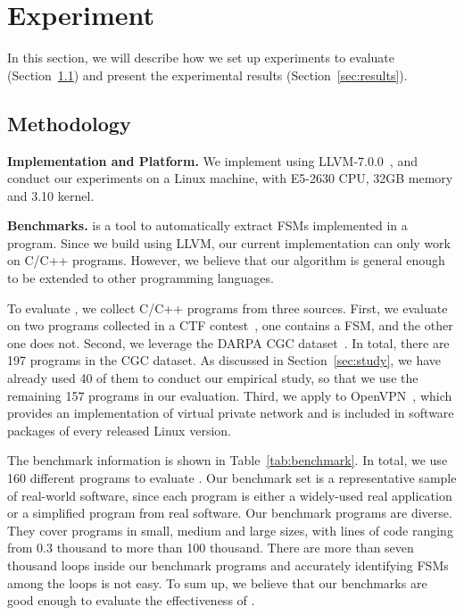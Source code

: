 \section{Experiment}
\label{sec:exp}

In this section, we will describe how we set up
experiments to evaluate \Tool{} (Section~\ref{sec:meth})
and present the experimental results (Section~\ref{sec:results}).

\subsection{Methodology}
\label{sec:meth}

\noindent\textbf{Implementation and Platform.}
We implement \Tool{} using LLVM-7.0.0~\cite{LLVM},
and conduct our experiments on a Linux machine,
with E5-2630 CPU, 32GB memory and 3.10 kernel.

\noindent\textbf{Benchmarks.}
\Tool{} is a tool to automatically extract FSMs implemented in a program.
Since we build \Tool{} using LLVM,
our current implementation can only work on C/C++ programs.
However, we believe that our algorithm is general enough
to be extended to other programming languages.


To evaluate \Tool{}, we collect C/C++ programs from three sources.
First, we evaluate \Tool{} on two programs collected in a CTF contest~\cite{ctf},
one contains a FSM, and the other one does not.
Second, we leverage the DARPA CGC dataset~\cite{CGC}.
In total, there are 197 programs in the CGC dataset.
As discussed in Section~\ref{sec:study},
we have already used 40 of them to conduct our empirical study,
so that we use the remaining 157 programs in our evaluation.
Third, we apply \Tool{} to OpenVPN~\cite{openvpn},
which provides an implementation of virtual private network and
is included in software packages of every released Linux version.



The benchmark information is shown in Table~\ref{tab:benchmark}.
In total, we use 160 different programs to evaluate \Tool{}.
Our benchmark set is a representative sample of real-world software,
since each program is either a widely-used real application or a simplified program
from real software.
Our benchmark programs are diverse.
They cover programs in small, medium and large sizes,
with lines of code ranging from 0.3 thousand to more than 100 thousand.
There are more than seven thousand
loops inside our benchmark programs and accurately
identifying FSMs among the loops is not easy.
To sum up, we believe that our benchmarks are good
enough to evaluate the effectiveness of \Tool{}.

